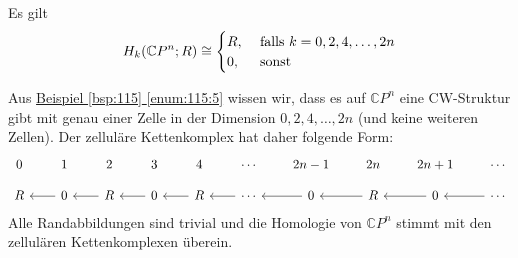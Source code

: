 \begin{beispiel}[{name=[{Homologie des komplex projektiven Raumes}]}]
	Es gilt 
	\[
		H_k \enbrace*{\mathbb{C}P^n;R} \cong  \begin{cases}
			R, &\text{ falls }k=0,2,4,\ldots ,2n\\
			0 ,&\text{ sonst}
		\end{cases}
	\]
\end{beispiel}
\begin{beweis}
	Aus \hyperref[enum:115:5]{Beispiel \ref*{bsp:115} \ref*{enum:115:5}} wissen wir, dass es auf $\mathbb{C}P^n$ eine CW-Struktur gibt mit genau einer Zelle in der Dimension $0,2,4, \ldots ,2n$ (und keine weiteren 
	Zellen). Der zelluläre Kettenkomplex hat daher folgende Form:
	\[
		\begin{tikzcd}[row sep=small,column sep=2.0em]
			0 & 1 & 2 & 3 & 4 & \cdots & 2n-1 & 2n & 2n +1 & \cdots \\
			R & 0 \lar & R \lar& 0 \lar & R \lar & \cdots \lar & 0 \lar& R \lar & 0 \lar & \cdots \lar
		\end{tikzcd}
	\]
	Alle Randabbildungen sind trivial und die Homologie von $\mathbb{C}P^n$ stimmt mit den zellulären Kettenkomplexen überein.
\end{beweis}

